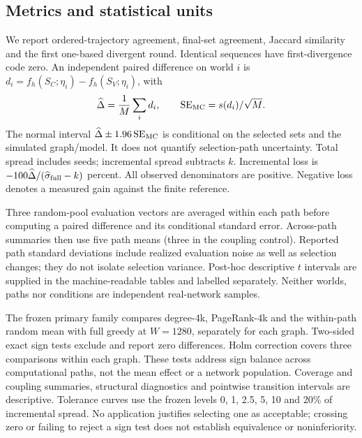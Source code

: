 \documentclass[smallextended]{svjour3}
\begin{document}
\subsection{Metrics and statistical units}
We report ordered-trajectory agreement, final-set agreement, Jaccard similarity and the first one-based divergent round. Identical sequences have first-divergence code zero. An independent paired difference on world $i$ is $d_i=f_h(S_C;\eta_i)-f_h(S_V;\eta_i)$, with
\begin{equation}
\widehat\Delta=\frac{1}{M}\sum_i d_i,\qquad
\operatorname{SE}_{\rm MC}=s(d_i)/\sqrt M.
\end{equation}
The normal interval $\widehat\Delta\pm1.96\operatorname{SE}_{\rm MC}$ is conditional on the selected sets and the simulated graph/model. It does not quantify selection-path uncertainty. Total spread includes seeds; incremental spread subtracts $k$. Incremental loss is $-100\widehat\Delta/(\widehat\sigma_{\rm full}-k)$ percent. All observed denominators are positive. Negative loss denotes a measured gain against the finite reference.

Three random-pool evaluation vectors are averaged within each path before computing a paired difference and its conditional standard error. Across-path summaries then use five path means (three in the coupling control). Reported path standard deviations include realized evaluation noise as well as selection changes; they do not isolate selection variance. Post-hoc descriptive $t$ intervals are supplied in the machine-readable tables and labelled separately. Neither worlds, paths nor conditions are independent real-network samples.

The frozen primary family compares degree-4k, PageRank-4k and the within-path random mean with full greedy at $W=1280$, separately for each graph. Two-sided exact sign tests exclude and report zero differences. Holm correction covers three comparisons within each graph. These tests address sign balance across computational paths, not the mean effect or a network population. Coverage and coupling summaries, structural diagnostics and pointwise transition intervals are descriptive. Tolerance curves use the frozen levels 0, 1, 2.5, 5, 10 and 20\% of incremental spread. No application justifies selecting one as acceptable; crossing zero or failing to reject a sign test does not establish equivalence or noninferiority.
\end{document}
